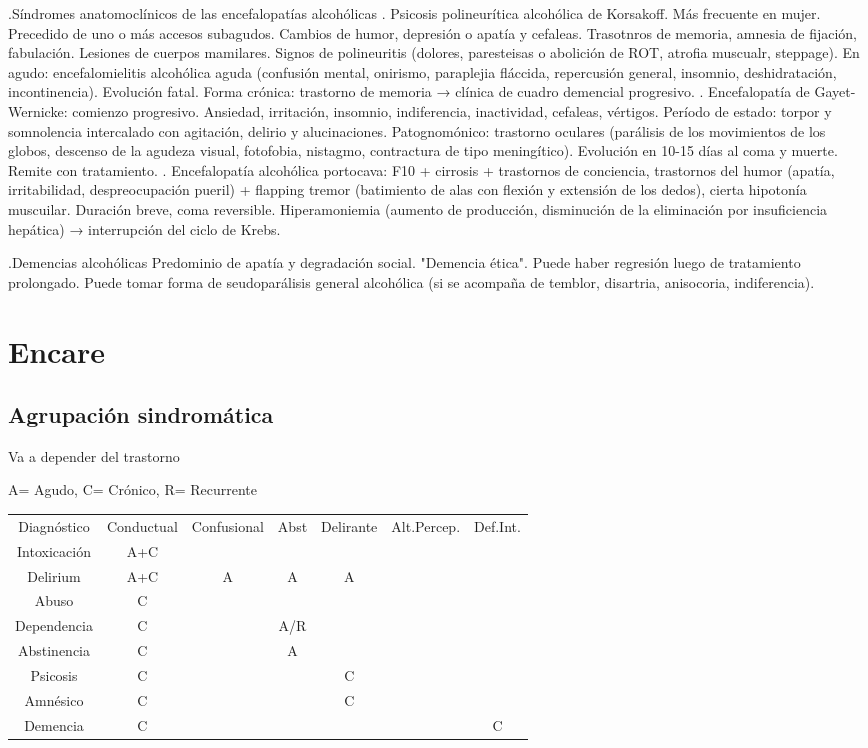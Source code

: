 .Síndromes anatomoclínicos de las encefalopatías alcohólicas
. Psicosis polineurítica alcohólica de Korsakoff. Más frecuente en mujer. Precedido de uno o más accesos subagudos. Cambios de humor, depresión o apatía y cefaleas. Trasotnros de memoria, amnesia de fijación, fabulación. Lesiones de cuerpos mamilares. Signos de polineuritis (dolores, paresteisas o abolición de ROT, atrofia muscualr, steppage). En agudo: encefalomielitis alcohólica aguda (confusión mental, onirismo, paraplejia fláccida, repercusión general, insomnio, deshidratación, incontinencia). Evolución fatal. Forma crónica: trastorno de memoria → clínica de cuadro demencial progresivo.
. Encefalopatía de Gayet-Wernicke: comienzo progresivo. Ansiedad, irritación, insomnio, indiferencia, inactividad, cefaleas, vértigos. Período de estado: torpor y somnolencia intercalado con agitación, delirio y alucinaciones. Patognomónico: trastorno oculares (parálisis de los movimientos de los globos, descenso de la agudeza visual, fotofobia, nistagmo, contractura de tipo meningítico). Evolución en 10-15 días al coma y muerte. Remite con tratamiento.
. Encefalopatía alcohólica portocava: F10 + cirrosis + trastornos de conciencia, trastornos del humor (apatía, irritabilidad, despreocupación pueril) + flapping tremor (batimiento de alas con flexión y extensión de los dedos), cierta hipotonía muscuilar. Duración breve, coma reversible. Hiperamoniemia (aumento de producción, disminución de la eliminación por insuficiencia hepática) → interrupción del ciclo de Krebs.

.Demencias alcohólicas
Predominio de apatía y degradación social. "Demencia ética". Puede haber regresión luego de tratamiento prolongado. Puede tomar forma de seudoparálisis general alcohólica (si se acompaña de temblor, disartria, anisocoria, indiferencia).
\section*{Encare}
\subsection*{Agrupación sindromática}
Va a depender del trastorno

A= Agudo, C= Crónico, R= Recurrente
\begin{center}
\begin{tabular}{|c|c|c|c|c|c|c|}
\hline
Diagnóstico & Conductual & Confusional & Abst & Delirante & Alt.Percep. & Def.Int.\\
Intoxicación & A+C &  & & &\\
Delirium & A+C & A & A & A\\
Abuso & C & & & &\\
Dependencia & C &  & A/R & & \\
Abstinencia & C & & A\\
Psicosis & C & & & C\\
Amnésico & C & & & C\\
Demencia & C & & & & & C\\
\hline
\end{tabular}
\end{center}
